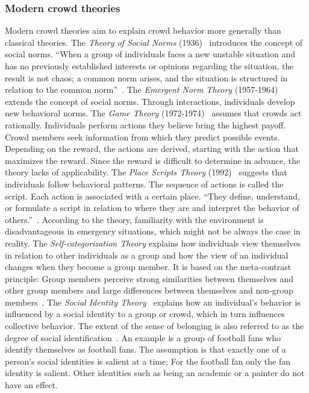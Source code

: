 \subsubsection{Modern crowd theories}

Modern crowd theories aim to explain crowd behavior more generally than classical theories.
The \textit{Theory of Social Norms} (1936)~\cite{sherif-1936-life} introduces the concept of social norms. \enquote{When a group of individuals faces a new unstable situation
and has no previously established interests or opinions regarding the situation, the result is not chaos; a common norm arises, and the situation is structured in relation to the
common norm}~\cite[p.111]{sherif-1936-life}. 
%
The \textit{Emergent Norm Theory} (1957-1964)~\cite{turner-1957-life} extends the concept of social norms. Through interactions, individuals develop new behavioral norms.
%
The \textit{Game Theory} (1972-1974)~\cite{berk-1974-life,berk-1974a-life} assumes that crowds act rationally. Individuals perform actions they believe bring the highest payoff. Crowd members seek information from which they predict possible events. Depending on the reward, the actions are derived, starting with the action that maximizes the reward. Since the reward is difficult to determine in advance, the theory lacks of applicability.
%
The \textit{Place Scripts Theory} (1992)~\cite{donald-1992-life} suggests that individuals follow behavioral patterns. The sequence of actions is called the script. Each action is associated with a certain place. \enquote{They define, understand, or formulate a script in relation to where they are and interpret the behavior of others.}~\cite{donald-1992-life}. According to the theory, familiarity with the environment is disadvantageous in emergency situations, which might not be always the case in reality. %
The \textit{Self-categorization Theory} explains how individuals view themselves in relation to other individuals as a group and how the view of an individual changes when they become a group member. It is based on the meta-contrast principle: Group members perceive strong similarities between themselves and other group members and large differences between themselves and non-group members~\cite{turner-1994-life}.
The \textit{Social Identity Theory}~\cite{tajfel-1974-life,tajfel-1979-life,tajfel-1982b-life,turner-1972-life,turner-1981-life,turner-1982-life,turner-1987c-life} explains how an individual's behavior is influenced by a social identity to a group or crowd, which in turn influences collective behavior. The extent of the sense of belonging is also referred to as the degree of social identification~\cite{templeton-2020-life}. An example is a group of football fans who identify themselves as football fans. The assumption is that exactly one of a person's social identities is salient at a time: For the football fan only the fan identity is salient. Other identities such as being an academic or a painter do not have an effect.

